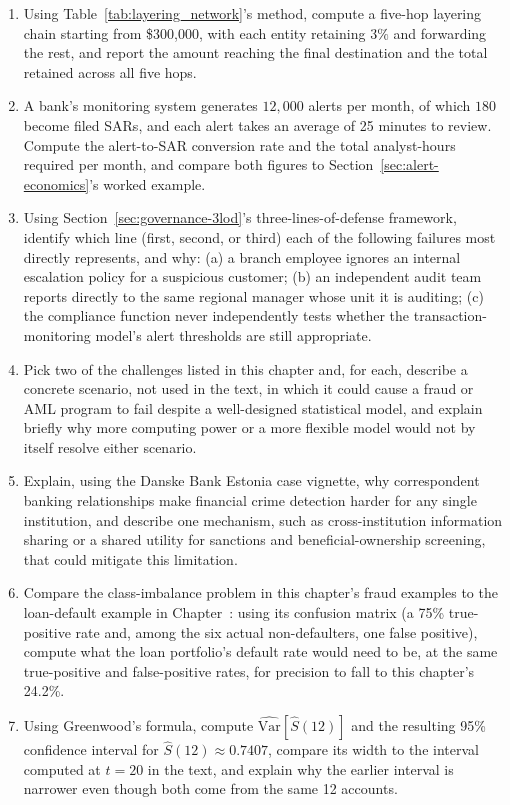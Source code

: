 \documentclass[../ai_in_finance]{subfiles}
\begin{document}
\begin{enumerate}[exercises]
    \item Using Table~\ref{tab:layering_network}'s method, compute a five-hop layering chain starting from \$300,000, with each entity retaining $3\%$ and forwarding the rest, and report the amount reaching the final destination and the total retained across all five hops.
    \item A bank's monitoring system generates $12{,}000$ alerts per month, of which $180$ become filed SARs, and each alert takes an average of 25 minutes to review. Compute the alert-to-SAR conversion rate and the total analyst-hours required per month, and compare both figures to Section~\ref{sec:alert-economics}'s worked example.
    \item Using Section~\ref{sec:governance-3lod}'s three-lines-of-defense framework, identify which line (first, second, or third) each of the following failures most directly represents, and why: (a) a branch employee ignores an internal escalation policy for a suspicious customer; (b) an independent audit team reports directly to the same regional manager whose unit it is auditing; (c) the compliance function never independently tests whether the transaction-monitoring model's alert thresholds are still appropriate.
    \item Pick two of the challenges listed in this chapter and, for each, describe a concrete scenario, not used in the text, in which it could cause a fraud or AML program to fail despite a well-designed statistical model, and explain briefly why more computing power or a more flexible model would not by itself resolve either scenario.
    \item Explain, using the Danske Bank Estonia case vignette, why correspondent banking relationships make financial crime detection harder for any single institution, and describe one mechanism, such as cross-institution information sharing or a shared utility for sanctions and beneficial-ownership screening, that could mitigate this limitation.
    \item Compare the class-imbalance problem in this chapter's fraud examples to the loan-default example in Chapter~: using its confusion matrix (a 75\% true-positive rate and, among the six actual non-defaulters, one false positive), compute what the loan portfolio's default rate would need to be, at the same true-positive and false-positive rates, for precision to fall to this chapter's 24.2\%.
    \item Using Greenwood's formula, compute $\widehat{\text{Var}}[\hat S(12)]$ and the resulting 95\% confidence interval for $\hat S(12)\approx0.7407$, compare its width to the interval computed at $t=20$ in the text, and explain why the earlier interval is narrower even though both come from the same 12 accounts.

\end{enumerate}
\end{document}
